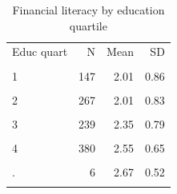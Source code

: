\begin{table}[htbp]\centering\small
\caption{Financial literacy by education quartile}
\label{tab:finlit_by_educ}
\begin{tabular}{lrrr}\toprule
Educ quart & N & Mean & SD \\\\ \midrule
1 & 147 & 2.01 & 0.86 \\\\
2 & 267 & 2.01 & 0.83 \\\\
3 & 239 & 2.35 & 0.79 \\\\
4 & 380 & 2.55 & 0.65 \\\\
. & 6 & 2.67 & 0.52 \\\\
\bottomrule
\end{tabular}\end{table}
